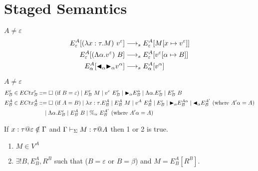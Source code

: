 \section{ Staged Semantics }


$A \neq \varepsilon$\\
\begin{align*}
	E^A_\varepsilon [(\lambda x:\tau.M)\ v^\varepsilon]          & \longrightarrow_s E^A_\varepsilon[M[x\mapsto v^\varepsilon]]                \\
	E^A_\varepsilon [(\Lambda\alpha.v^\varepsilon)\ B] & \longrightarrow_s E^A_\varepsilon[v^\varepsilon[\alpha\mapsto B]] \\
	E^A_\alpha [{\mathop{\blacktriangleleft}}_\alpha {\mathop{\blacktriangleright}}_\alpha v^\alpha]                 & \longrightarrow_s E^A_\alpha[v^\alpha]                                      \\
\end{align*}

$A \neq \varepsilon$\\
\begin{align*}
	E^\varepsilon_B \in ECtx^\varepsilon_B & ::= \square\ (\text{if\ } B = \varepsilon) \mid E^\varepsilon_B\ M \mid v^e\ E^\varepsilon_B
	\mid {\mathop{\blacktriangleright}}_\alpha E^\alpha_B \mid \Lambda\alpha.E^\varepsilon_B
	\mid E^\varepsilon_B\ B                                                                                                     \\
	E^A_B \in ECtx^A_B                     & ::= \square\ (\text{if } A = B) \mid \lambda x:\tau.E^A_B \mid E^A_B\ M \mid v^A\ E^A_B
	\mid E^\varepsilon_B \mid {\mathop{\blacktriangleright}}_\alpha E^{A\alpha}_B
	\mid {\mathop{\blacktriangleleft}}_\alpha E^{A'}_B \ (\text{where } A'\alpha = A)                                                                              \\
	                                       & \quad \mid \Lambda\alpha.E^\varepsilon_B
	\mid E^A_B\ B \mid \%_\alpha\ E^{A'}_B \ (\text{where } A'\alpha = A)                                                       \\
\end{align*}

\begin{lemma}
	If $x:\tau@\varepsilon \notin \G$ and $\Gamma \vdash_\Sigma M : \tau @ A$ then 1 or 2 is true.
	\begin{enumerate}
		\item $ M \in V^A$
		\item $\exists ! B, E^A_B, R^B$ such that ($B = \varepsilon$ or $B = \beta$) and $M = E^A_B[R^B]$.
	\end{enumerate}
\end{lemma}

